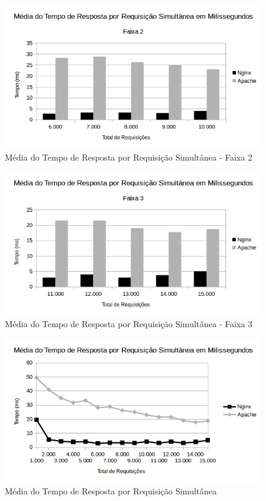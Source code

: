 \begin{figure}[H]
	\centering
	\includegraphics[width=1\linewidth]{graficos/grafico5-f2} 
	\caption{Média do Tempo de Resposta por Requisição Simultânea - Faixa 2}
	\label{fig:grafico5-f2}
\end{figure}

\begin{figure}[H]
	\centering
	\includegraphics[width=1\linewidth]{graficos/grafico5-f3} 
	\caption{Média do Tempo de Resposta por Requisição Simultânea - Faixa 3}
	\label{fig:grafico5-f3}
\end{figure}

\begin{figure}[H]
	\centering
	\includegraphics[width=1\linewidth]{graficos/grafico5} 
	\caption{Média do Tempo de Resposta por Requisição Simultânea}
	\label{fig:grafico5}
\end{figure}

